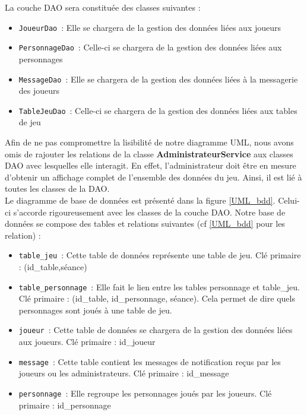 \documentclass[11pt]{article}
\begin{document}
La couche DAO sera constituée des classes suivantes :

\begin{itemize}
    \item \texttt{JoueurDao}~: Elle se chargera de la gestion des données liées aux joueurs
    
    \item \texttt{PersonnageDao}~: Celle-ci se chargera de la gestion des données liées aux personnages
    
    \item \texttt{MessageDao}~: Elle se chargera de la gestion des données liées à la messagerie des joueurs
 
    \item \texttt{TableJeuDao}~: Celle-ci se chargera de la gestion des données liées aux tables de jeu

\end{itemize}

Afin de ne pas compromettre la lisibilité de notre diagramme UML, nous avons omis de rajouter les relations de la classe  \textbf{AdministrateurService} aux classes DAO avec lesquelles elle interagit. En effet, l'administrateur doit être en mesure d'obtenir un affichage complet de l'ensemble des données du jeu. Ainsi, il est lié à toutes les classes de la DAO.\\

Le diagramme de base de données est présenté dans la figure \ref{UML_bdd}. Celui-ci s'accorde rigoureusement avec les classes de la couche DAO. Notre base de données se compose des tables et relations suivantes (cf \ref{UML_bdd} pour les relation) :  

\begin{itemize}
    \item \texttt{table\_jeu}~: Cette table de données représente une table de jeu. Clé primaire : (id\_table,séance)
    
    \item \texttt{table\_personnage}~: Elle fait le lien entre les tables personnage et table\_jeu. Clé primaire : (id\_table, id\_personnage, séance). Cela permet de dire quels personnages sont joués à une table de jeu.
    
    \item \texttt{joueur}~: Cette table de données se chargera de la gestion des données liées aux joueurs. Clé primaire : id\_joueur
 
    \item \texttt{message}~: Cette table contient les messages de notification reçus par les joueurs ou les administrateurs. Clé primaire : id\_message
    
    \item \texttt{personnage}~: Elle regroupe les personnages joués par les joueurs. Clé primaire : id\_personnage

\end{itemize}
\end{document}
